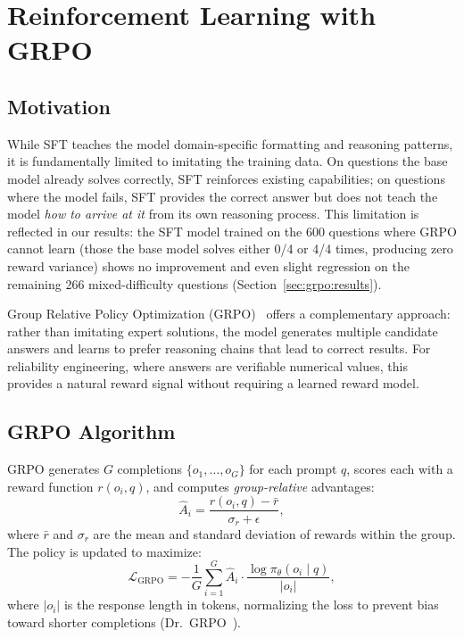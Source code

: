 \section{Reinforcement Learning with GRPO}
\label{sec:grpo}

\subsection{Motivation}
\label{sec:grpo:motivation}

While SFT teaches the model domain-specific formatting and reasoning patterns, it is fundamentally limited to imitating the training data. On questions the base model already solves correctly, SFT reinforces existing capabilities; on questions where the model fails, SFT provides the correct answer but does not teach the model \emph{how to arrive at it} from its own reasoning process. This limitation is reflected in our results: the SFT model trained on the 600 questions where GRPO cannot learn (those the base model solves either 0/4 or 4/4 times, producing zero reward variance) shows no improvement and even slight regression on the remaining 266 mixed-difficulty questions (Section~\ref{sec:grpo:results}).

Group Relative Policy Optimization (GRPO)~\cite{shao2024deepseekmath} offers a complementary approach: rather than imitating expert solutions, the model generates multiple candidate answers and learns to prefer reasoning chains that lead to correct results. For reliability engineering, where answers are verifiable numerical values, this provides a natural reward signal without requiring a learned reward model.

\subsection{GRPO Algorithm}
\label{sec:grpo:method}

GRPO generates $G$ completions $\{o_1, \ldots, o_G\}$ for each prompt $q$, scores each with a reward function $r(o_i, q)$, and computes \emph{group-relative} advantages:
\begin{equation}
    \hat{A}_i = \frac{r(o_i, q) - \bar{r}}{\sigma_r + \epsilon},
    \label{eq:grpo_advantage}
\end{equation}
where $\bar{r}$ and $\sigma_r$ are the mean and standard deviation of rewards within the group. The policy is updated to maximize:
\begin{equation}
    \mathcal{L}_{\text{GRPO}} = -\frac{1}{G} \sum_{i=1}^{G} \hat{A}_i \cdot \frac{\log \pi_\theta(o_i \mid q)}{|o_i|},
    \label{eq:grpo_loss}
\end{equation}
where $|o_i|$ is the response length in tokens, normalizing the loss to prevent bias toward shorter completions (Dr.~GRPO~\cite{deepseek2025r1}).

